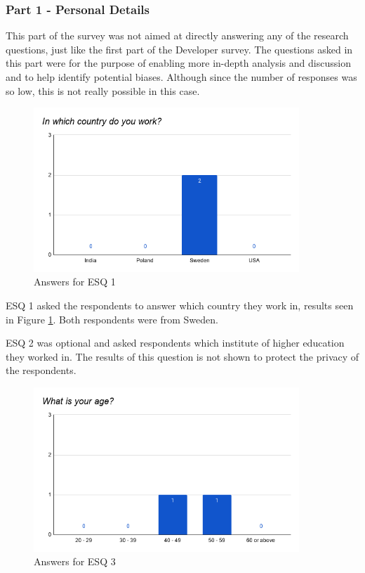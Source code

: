 \documentclass[a4paper,12pt]{article}
\begin{document}
\subsubsection{Part 1 - Personal Details}
\label{Results_edu_part1}
This part of the survey was not aimed at directly answering any of the research questions, just like the first part of the Developer survey. The questions asked in this part were for the purpose of enabling more in-depth analysis and discussion and to help identify potential biases. Although since the number of responses was so low, this is not really possible in this case.

\begin{figure}[ht!]
    \centering
    \includegraphics[width=10cm]{img/Results/esq1.png}
    \caption{Answers for ESQ 1}
    \label{fig:res_eduq1}
\end{figure}
\newpage
ESQ 1 asked the respondents to answer which country they work in, results seen in Figure \ref{fig:res_eduq1}. Both respondents were from Sweden.

ESQ 2 was optional and asked respondents which institute of higher education they worked in. The results of this question is not shown to protect the privacy of the respondents.

\begin{figure}[ht!]
    \centering
    \includegraphics[width=10cm]{img/Results/esq3.png}
    \caption{Answers for ESQ 3}
    \label{fig:res_eduq3}
\end{figure}
\end{document}
